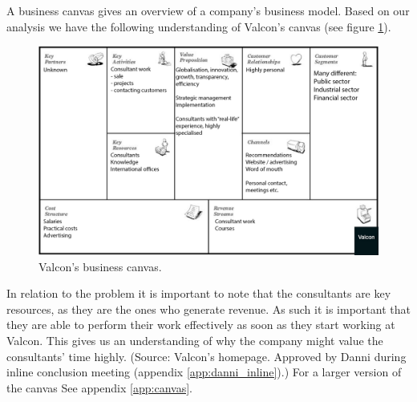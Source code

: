 A business canvas gives an overview of a company's business model.
Based on our analysis we have the following understanding of Valcon's canvas (see figure \ref{fig:canvas}).

\begin{figure}[!htp]
\includegraphics[width=\textwidth]{inline/business-model-canvas.png}
\caption{Valcon's business canvas.}
\label{fig:canvas}
\end{figure}

In relation to the problem it is important to note that the consultants are key resources, as they are the ones who generate revenue.
As such it is important that they are able to perform their work effectively as soon as they start working at Valcon. This gives us an understanding of why the company might value the consultants' time highly. (Source: Valcon's homepage. Approved by Danni during inline conclusion meeting (appendix \ref{app:danni_inline}).) 
For a larger version of the canvas See appendix \ref{app:canvas}.